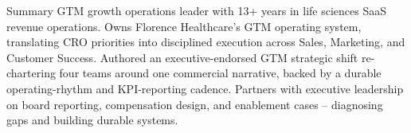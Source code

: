 \documentclass{resume}
\begin{document}
\vspace{-0.15cm}

\begin{rSection}{Summary}
GTM growth operations leader with 13+ years in life sciences SaaS revenue operations. Owns Florence Healthcare's GTM operating system, translating CRO priorities into disciplined execution across Sales, Marketing, and Customer Success. Authored an executive-endorsed GTM strategic shift re-chartering four teams around one commercial narrative, backed by a durable operating-rhythm and KPI-reporting cadence. Partners with executive leadership on board reporting, compensation design, and enablement cases -- diagnosing gaps and building durable systems.
\end{rSection}
\vspace{-0.15cm}
\end{document}
